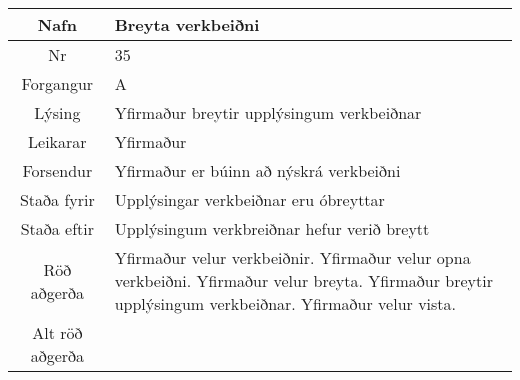 \documentclass[a4paper]{article}
\begin{document}
\begin{tabular}{|c|p{10cm}|}
\hline
Nafn&Breyta verkbeiðni\\
\hline
Nr&35\\
\hline
Forgangur&A\\
\hline
Lýsing&Yfirmaður breytir upplýsingum verkbeiðnar\\
\hline
Leikarar&Yfirmaður\\
\hline
Forsendur&Yfirmaður er búinn að nýskrá verkbeiðni\\
\hline
Staða fyrir&Upplýsingar verkbeiðnar eru óbreyttar\\
\hline
Staða eftir&Upplýsingum verkbreiðnar hefur verið breytt\\
\hline
Röð aðgerða&Yfirmaður velur verkbeiðnir. Yfirmaður velur opna verkbeiðni. Yfirmaður velur breyta. Yfirmaður breytir upplýsingum verkbeiðnar. Yfirmaður velur vista.\\
\hline
Alt röð aðgerða&\\
\hline
\end{tabular}
\end{document}
